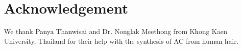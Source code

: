\documentclass{article}
\begin{document}
\section{Acknowledgement}
We thank Panya Thanwisai and Dr. Nonglak Meethong from Khong Kaen University, Thailand for their help with the synthesis of AC from human hair. 


 
\end{document}
